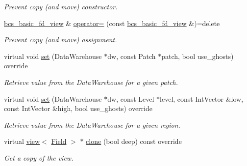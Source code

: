 \begin{DoxyCompactItemize}
\begin{DoxyCompactList}\small\item\em Prevent copy (and move) constructor. \end{DoxyCompactList}\item 
\hyperlink{classUintah_1_1PhaseField_1_1detail_1_1bcs__basic__fd__view}{bcs\+\_\+basic\+\_\+fd\+\_\+view} \& \hyperlink{classUintah_1_1PhaseField_1_1detail_1_1bcs__basic__fd__view_3_01ScalarField_3_01T_01_4_00_01STN_07caa9955adf783da0505eac75e76f08_a68f359b2c857a801daf7875ee6e1c3cf}{operator=} (const \hyperlink{classUintah_1_1PhaseField_1_1detail_1_1bcs__basic__fd__view}{bcs\+\_\+basic\+\_\+fd\+\_\+view} \&)=delete
\begin{DoxyCompactList}\small\item\em Prevent copy (and move) assignment. \end{DoxyCompactList}\item 
virtual void \hyperlink{classUintah_1_1PhaseField_1_1detail_1_1bcs__basic__fd__view_3_01ScalarField_3_01T_01_4_00_01STN_07caa9955adf783da0505eac75e76f08_afe8b66fd39607e8f5b5e79ae5d6e0df3}{set} (Data\+Warehouse $\ast$dw, const Patch $\ast$patch, bool use\+\_\+ghosts) override
\begin{DoxyCompactList}\small\item\em Retrieve value from the Data\+Warehouse for a given patch. \end{DoxyCompactList}\item 
virtual void \hyperlink{classUintah_1_1PhaseField_1_1detail_1_1bcs__basic__fd__view_3_01ScalarField_3_01T_01_4_00_01STN_07caa9955adf783da0505eac75e76f08_aef6c3677070fcceb4a3e3c4fe3531e09}{set} (Data\+Warehouse $\ast$dw, const Level $\ast$level, const Int\+Vector \&low, const Int\+Vector \&high, bool use\+\_\+ghosts) override
\begin{DoxyCompactList}\small\item\em Retrieve value from the Data\+Warehouse for a given region. \end{DoxyCompactList}\item 
virtual \hyperlink{classUintah_1_1PhaseField_1_1detail_1_1view}{view}$<$ \hyperlink{structUintah_1_1PhaseField_1_1ScalarField}{Field} $>$ $\ast$ \hyperlink{classUintah_1_1PhaseField_1_1detail_1_1bcs__basic__fd__view_3_01ScalarField_3_01T_01_4_00_01STN_07caa9955adf783da0505eac75e76f08_a5f5cdae9c3953834dfc8167e5ac9dafb}{clone} (bool deep) const override
\begin{DoxyCompactList}\small\item\em Get a copy of the view. \end{DoxyCompactList}\item 

\end{DoxyCompactItemize}
